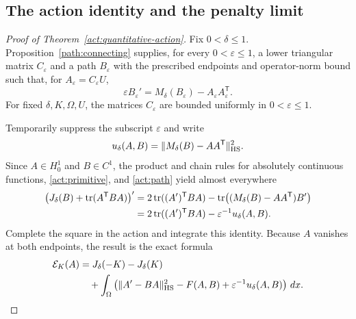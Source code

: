 \subsection{The action identity and the penalty limit}

\begin{proof}[Proof of Theorem~\ref{act:quantitative-action}]
Fix $0<\delta\leq1$.  Proposition~\ref{path:connecting} supplies,
for every $0<\varepsilon\leq1$, a lower triangular matrix
$C_\varepsilon$ and a path $B_\varepsilon$ with the prescribed
endpoints and operator-norm bound such that, for
$A_\varepsilon=C_\varepsilon U$,
\begin{equation}\label{act:path}
 \varepsilon B_\varepsilon'
       =M_\delta(B_\varepsilon)
                    -A_\varepsilon A_\varepsilon^{\mathsf T}.
\end{equation}
For fixed $\delta,K,\Omega,U$, the matrices $C_\varepsilon$ are
bounded uniformly in $0<\varepsilon\leq1$.

Temporarily suppress the subscript $\varepsilon$ and write
\[
                 u_\delta(A,B)
                      =\|M_\delta(B)-AA^{\mathsf T}\|_{\mathrm{HS}}^2.
\]
Since $A\in H^1_0$ and $B\in C^1$, the product and chain rules
for absolutely continuous functions, \eqref{act:primitive}, and
\eqref{act:path} yield almost everywhere
\begin{align*}
 \bigl(J_\delta(B)+\operatorname{tr}(A^{\mathsf T}BA)\bigr)'
 &=2\operatorname{tr}((A')^{\mathsf T}BA)
          -\operatorname{tr}\bigl((M_\delta(B)-AA^{\mathsf T})B'\bigr)\\
 &=2\operatorname{tr}((A')^{\mathsf T}BA)-\varepsilon^{-1}u_\delta(A,B).
\end{align*}
Complete the square in the action and integrate this identity.
Because $A$ vanishes at both endpoints, the result is the exact
formula
\begin{align}
 \mathcal E_K(A)
 &=J_\delta(-K)-J_\delta(K)\notag\\
 &\quad+\int_\Omega\left(
       \|A'-BA\|_{\mathrm{HS}}^2-F(A,B)
                          +\varepsilon^{-1}u_\delta(A,B)\right)\,dx.
       \label{act:identity}
\end{align}


\end{proof}
